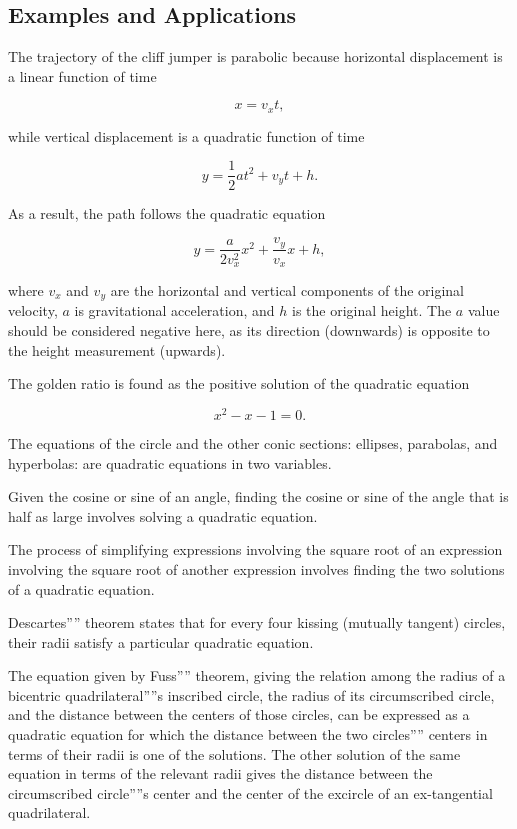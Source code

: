 \subsection{Examples and Applications}
\label{sss:exam-0907}


The trajectory of the cliff jumper is parabolic because horizontal displacement is a
linear function of time

\[
x = v_x t,
\]

while vertical displacement is a quadratic function of time

\[
y = \frac{1}{2} a t^2 + v_y t + h.
\] 

As a result, the path follows the quadratic equation

\[
y = \frac{a}{2v_x^2} x^2 + \frac{v_y}{v_x} x + h,
\]

where $v_x$ and $v_y$ are the horizontal and vertical components of the original velocity, $a$ is gravitational acceleration, and $h$ is the original height. The $a$ value should be considered negative here, as its direction (downwards) is opposite to the height measurement (upwards).

The golden ratio is found as the positive solution of the quadratic equation

\[
x^2 - x - 1 = 0.
\]

The equations of the circle and the other conic sections: ellipses, parabolas, and
hyperbolas: are quadratic equations in two variables.

Given the cosine or sine of an angle, finding the cosine or sine of the angle that is half
as large involves solving a quadratic equation.

The process of simplifying expressions involving the square root of an expression
involving the square root of another expression involves finding the two solutions of a
quadratic equation.

Descartes'''' theorem states that for every four kissing (mutually tangent) circles, their
radii satisfy a particular quadratic equation.

The equation given by Fuss'''' theorem, giving the relation among the radius of a
bicentric quadrilateral''''s inscribed circle, the radius of its circumscribed circle, and
the distance between the centers of those circles, can be expressed as a quadratic
equation for which the distance between the two circles'''' centers in terms of their
radii is one of the solutions. The other solution of the same equation in terms of the
relevant radii gives the distance between the circumscribed circle''''s center and the
center of the excircle of an ex-tangential quadrilateral.

